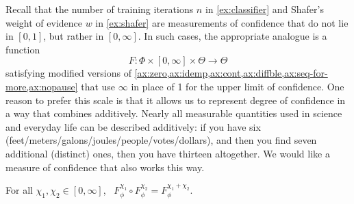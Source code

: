 



Recall that the number of training iterations $n$ in \cref{ex:classifier}
and Shafer's weight of evidence $w$ in \cref{ex:shafer}
are measurements of confidence that do not lie in $[0,1]$, but
 rather in $[0,\infty]$. 
In such cases,
the appropriate analogue is a function
\begin{equation}
	F : \Phi \times [0, \infty] \times \Theta \to \Theta
	\label{eq:zero-inf-form}
\end{equation}
satisfying modified versions of
\cref{ax:zero,ax:idemp,ax:cont,ax:diffble,ax:seq-for-more,ax:nopause}
that use $\infty$ in place of 1 for the upper limit of confidence. 
One reason to prefer this scale is that it 
allows us to represent degree of confidence in a way that combines additively. 
Nearly all measurable quantities used in science 
and everyday life can be described additively:
if you have six (feet/meters/galons/joules/people/votes/dollars), 
and then you find seven additional (distinct) ones, then you have thirteen altogether. 
We would like a measure of confidence that also works this way.

\begin{CFaxioms}
	\item For all
		$\chi_1, \chi_2 \in [0,\infty]$,~
		$F^{\chi_1}_\phi \circ F^{\chi_2}_\phi = F^{\chi_1 + \chi_2}_\phi$.
		\label{ax:additivity}
\end{CFaxioms}

